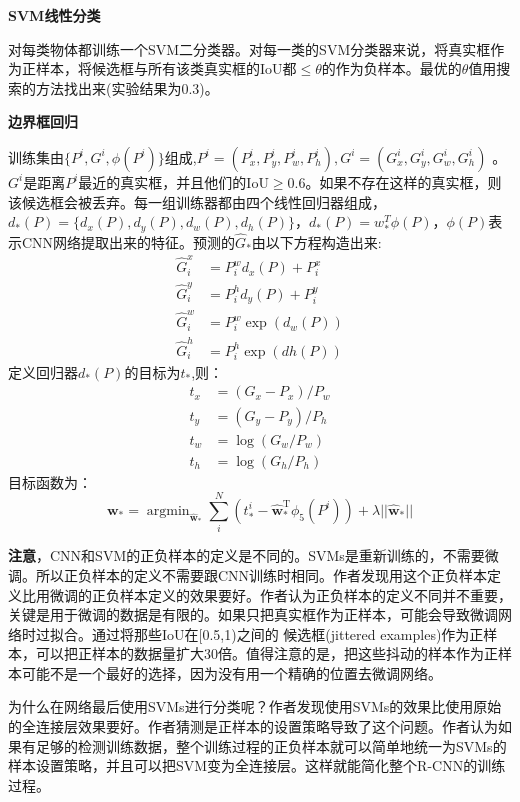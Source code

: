 \documentclass[]{article}
\begin{document}
\textbf{SVM线性分类}

对每类物体都训练一个SVM二分类器。对每一类的SVM分类器来说，将真实框作为正样本，将候选框与所有该类真实框的IoU都$\leq \theta$的作为负样本。最优的$\theta$值用搜索的方法找出来(实验结果为0.3)。

\textbf{边界框回归}

训练集由$\{P^i,G^i ,\phi (P^i )\}$组成,${P^i}=(P^i_x,P^i_y,P^i_w,P^i_h),{G^i}=(G^i_x,G^i_y,G^i_w,G^i_h)$ 。$G^i$是距离$P^i$最近的真实框，并且他们的IoU$\geq0.6$。如果不存在这样的真实框，则该候选框会被丢弃。每一组训练器都由四个线性回归器组成，$d_*(P)=\{d_x(P),d_y(P),d_w(P),d_h(P)\}$，$d_*(P) = w_*^T\phi(P)$，$\phi(P)$表示CNN网络提取出来的特征。预测的$\hat{G}_*$由以下方程构造出来:
\begin{align}
\hat{G}_i^x & =  P_i^wd_x(P) + P_i^x \\
\hat{G}_i^y & =  P_i^hd_y(P) + P_i^y \\
\hat{G}_i^w & =  P_i^w\exp(d_w(P)) \\
\hat{G}_i^h & =  P_i^h\exp(dh(P)) 
\end{align}
定义回归器$d_*(P)$的目标为$t_*$,则：
\label{t*}
\begin{align}
	t_x&=(G_x - P_x)/P_w \\
	t_y&=(G_y - P_y)/P_h \\
	t_w&=\log(G_w / P_w)  \\
	t_h&=\log(G_h / P_h)
\end{align}
目标函数为：
\begin{equation}
\mathbf{w_*}=\mathop{\arg\min}_{\hat{\mathbf{w}}_*} \sum_{i}^{N}(t_{*}^{i}-\hat{\mathbf{w}}_*^{\text{T}} \phi_5 (P^i ))+\lambda || \hat{\mathbf{w}}_* ||
\end{equation}

\textbf{注意}，CNN和SVM的正负样本的定义是不同的。SVMs是重新训练的，不需要微调。所以正负样本的定义不需要跟CNN训练时相同。作者发现用这个正负样本定义比用微调的正负样本定义的效果要好。作者认为正负样本的定义不同并不重要，关键是用于微调的数据是有限的。如果只把真实框作为正样本，可能会导致微调网络时过拟合。通过将那些IoU在[0.5,1)之间的
候选框(jittered examples)作为正样本，可以把正样本的数据量扩大30倍。值得注意的是，把这些抖动的样本作为正样本可能不是一个最好的选择，因为没有用一个精确的位置去微调网络。

为什么在网络最后使用SVMs进行分类呢？作者发现使用SVMs的效果比使用原始的全连接层效果要好。作者猜测是正样本的设置策略导致了这个问题。作者认为如果有足够的检测训练数据，整个训练过程的正负样本就可以简单地统一为SVMs的样本设置策略，并且可以把SVM变为全连接层。这样就能简化整个R-CNN的训练过程。
\end{document}

